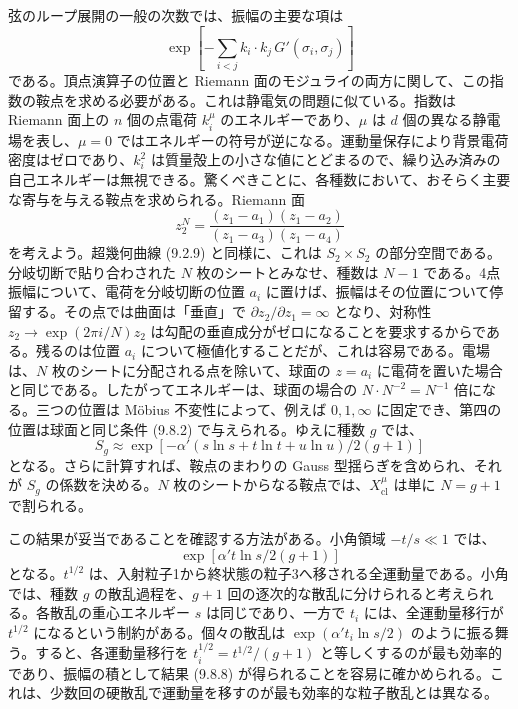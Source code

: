 弦のループ展開の一般の次数では、振幅の主要な項は
\begin{equation}
\exp\left[-\sum_{i<j}k_i\cdot k_j\,G'(\sigma_i,\sigma_j)\right]
\tag{9.8.5}\label{eq:9.8.5}
\end{equation}
である。頂点演算子の位置と Riemann 面のモジュライの両方に関して、この指数の鞍点を求める必要がある。これは静電気の問題に似ている。指数は Riemann 面上の $n$ 個の点電荷 $k_i^\mu$ のエネルギーであり、$\mu$ は $d$ 個の異なる静電場を表し、$\mu=0$ ではエネルギーの符号が逆になる。運動量保存により背景電荷密度はゼロであり、$k_i^2$ は質量殻上の小さな値にとどまるので、繰り込み済みの自己エネルギーは無視できる。驚くべきことに、各種数において、おそらく主要な寄与を与える鞍点を求められる。Riemann 面
\begin{equation}
z_2^N=\frac{(z_1-a_1)(z_1-a_2)}{(z_1-a_3)(z_1-a_4)}
\tag{9.8.6}\label{eq:9.8.6}
\end{equation}
を考えよう。超幾何曲線 (9.2.9) と同様に、これは $S_2\times S_2$ の部分空間である。分岐切断で貼り合わされた $N$ 枚のシートとみなせ、種数は $N-1$ である。4点振幅について、電荷を分岐切断の位置 $a_i$ に置けば、振幅はその位置について停留する。その点では曲面は「垂直」で $\partial z_2/\partial z_1=\infty$ となり、対称性 $z_2\to\exp(2\pi i/N)z_2$ は勾配の垂直成分がゼロになることを要求するからである。残るのは位置 $a_i$ について極値化することだが、これは容易である。電場は、$N$ 枚のシートに分配される点を除いて、球面の $z=a_i$ に電荷を置いた場合と同じである。したがってエネルギーは、球面の場合の $N\cdot N^{-2}=N^{-1}$ 倍になる。三つの位置は Möbius 不変性によって、例えば $0,1,\infty$ に固定でき、第四の位置は球面と同じ条件 (9.8.2) で与えられる。ゆえに種数 $g$ では、
\begin{equation}
S_g\approx
\exp[-\alpha'(s\ln s+t\ln t+u\ln u)/2(g+1)]
\tag{9.8.7}\label{eq:9.8.7}
\end{equation}
となる。さらに計算すれば、鞍点のまわりの Gauss 型揺らぎを含められ、それが $S_g$ の係数を決める。$N$ 枚のシートからなる鞍点では、$X_{\mathrm{cl}}^\mu$ は単に $N=g+1$ で割られる。

この結果が妥当であることを確認する方法がある。小角領域 $-t/s\ll1$ では、
\begin{equation}
\exp[\alpha't\ln s/2(g+1)]
\tag{9.8.8}\label{eq:9.8.8}
\end{equation}
となる。$t^{1/2}$ は、入射粒子1から終状態の粒子3へ移される全運動量である。小角では、種数 $g$ の散乱過程を、$g+1$ 回の逐次的な散乱に分けられると考えられる。各散乱の重心エネルギー $s$ は同じであり、一方で $t_i$ には、全運動量移行が $t^{1/2}$ になるという制約がある。個々の散乱は $\exp(\alpha't_i\ln s/2)$ のように振る舞う。すると、各運動量移行を $t_i^{1/2}=t^{1/2}/(g+1)$ と等しくするのが最も効率的であり、振幅の積として結果 (9.8.8) が得られることを容易に確かめられる。これは、少数回の硬散乱で運動量を移すのが最も効率的な粒子散乱とは異なる。

